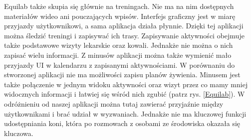 \documentclass[12pt,oneside]{report}
\begin{document}
Equilab także skupia się głównie na treningach. Nie ma na nim dostępnych materiałów wideo ani pouczających wpisów. Interfejs graficzny jest w miarę przyjazdy użytkownikowi, a sama aplikacja działa płynnie. Dzięki tej aplikacji można śledzić treningi i zapisywać ich trasy. Zapisywanie aktywności obejmuje także podstawowe wizyty lekarskie oraz kowali. Jednakże nie można o nich zapisać wielu informacji. Z minusów aplikacji można także wymienić mało przyjazdy UI w kalendarzu z zapisanymi aktywnościami. W porównaniu do stworzonej aplikacji nie ma możliwości zapisu planów żywienia. Minusem jest także połączenie w jednym widoku aktywności oraz wizyt przez co mamy mniej widocznych informacji i łatwiej się wśród nich zgubić (patrz rys. \ref{Equilab}). W odróżnieniu od naszej aplikacji można tutaj zawierać przyjaźnie między użytkownikami i brać udział w wyzwaniach. Jednakże nie ma kluczowej funkcji udostępniania koni, która po rozmowach z osobami ze środowiska okazała się kluczowa.
\end{document}
